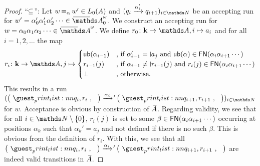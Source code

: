 \documentclass[a4paper,UKenglish,cleveref,autoref,thm-restate,numberwithinsect,final]{lipics-v2021}
\begin{document}
    \begin{proof}
      \noindent\enquote{$\subseteq$}: Let $w \operatorname{\equiv_{\alpha}} w' \in L_0(A)$ and $(q_i \xra{\alpha'_i} q_{i + 1})_{i \in \Nat}$
      be an accepting run for $w' = \alpha_0'\alpha_1'\alpha_2'\cdots \in \barAw_0$. We construct an accepting
      run for $w = \alpha_0\alpha_1\alpha_2\cdots \in \barAw$.
      We define $r_0\colon \mathbf{k} \to \names, i \mapsto a_i$ and for all $i = 1, 2, \dots$ the map
      \[ r_i\colon \mathbf{k} \to \names, j \mapsto \begin{cases} 
        \ub(\alpha_{i - 1}) & \text{, if $\alpha_{i - 1}' = \newletter{a_j}$ and $\ub(\alpha) \in \FN(\alpha_i\alpha_{i + 1}\cdots)$} \\
        r_{i - 1}(j) & \text{, if $\alpha_{i - 1} \neq \newletter{r_{i-1}(j)}$ and $r_i(j) \in \FN(\alpha_i\alpha_{i + 1}\cdots)$} \\
        \bot & \text{, otherwise.}
      \end{cases} \]
      This results in a run $(\maketuple{q_i,r_i} \xra{\alpha_i}\!'{}\, \maketuple{q_{i + 1},r_{i+1}})_{i \in \Nat}$
      for $w$. Acceptance is obvious by construction of $\barA$. Regarding validity, we see that for all $i \in \Nat\setminus\set{0}$, $r_i(j)$ is set to some $\beta \in \mathsf{FN}(\alpha_i\alpha_{i+1}\cdots)$ occurring
      at positions $\alpha_k$ such that $\alpha_k' = a_j$ and not defined if there is no such $\beta$.
      This is obvious from the definition of $r_i$.
      With this, we see that all $\maketuple{q_i,r_i} \xra{\alpha_i}\!'{}\, \maketuple{q_{i + 1},r_{i+1}}$ are indeed
      valid transitions in $\barA$.


\end{proof}
\end{document}
